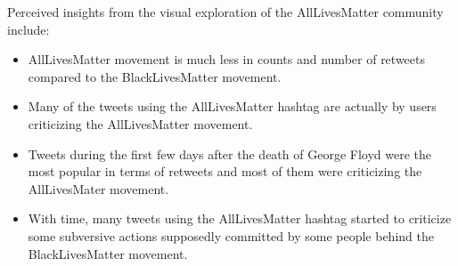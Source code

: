 Perceived insights from the visual exploration of the AllLivesMatter community include:

\begin{itemize}
    \item AllLivesMatter movement is much less in counts and number of retweets compared to the BlackLivesMatter movement.
    \item Many of the tweets using the AllLivesMatter hashtag are actually by users criticizing the AllLivesMatter movement.
    \item Tweets during the first few days after the death of George Floyd were the most popular in terms of retweets and most of them were criticizing the AllLivesMater movement.
    \item With time, many tweets using the AllLivesMatter hashtag started to criticize some subversive actions supposedly committed by some people behind the BlackLivesMatter movement.  
    
 
 
\end{itemize}


